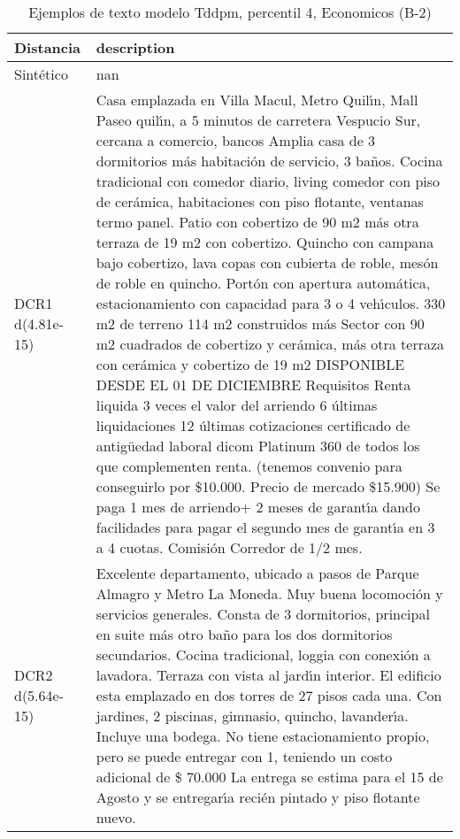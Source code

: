 \begin{table}[H]
\centering
\fontsize{10}{14}\selectfont
\caption{Ejemplos de texto modelo Tddpm, percentil 4, Economicos (B-2)}
\label{table-example-economicos-b-2-tddpm_mlp-4p-text}
\begin{tabular}{|l|m{35em}|}
\hline
\rowcolor[gray]{0.8}
Distancia & description \\
\hline Sintético & nan \\
\hline DCR1 d(4.81e-15) & Casa emplazada en Villa Macul, Metro Quil{\'\i}n, Mall Paseo quil{\'\i}n, a 5 minutos de carretera Vespucio Sur, cercana a comercio, bancos Amplia casa de 3 dormitorios m\'as habitaci\'on de servicio, 3 ba\~nos. Cocina tradicional con comedor diario, living comedor con piso de cer\'amica, habitaciones con piso flotante, ventanas termo panel. Patio con cobertizo de 90 m2 m\'as otra terraza de 19 m2 con cobertizo. Quincho con campana bajo cobertizo, lava copas con cubierta de roble, mes\'on de roble en quincho. Port\'on con apertura autom\'atica, estacionamiento con capacidad para 3 o 4 veh{\'\i}culos.   330 m2 de terreno 114 m2 construidos m\'as Sector con 90 m2 cuadrados de cobertizo y cer\'amica, m\'as otra terraza con cer\'amica y cobertizo de 19 m2  DISPONIBLE DESDE EL 01 DE DICIEMBRE  Requisitos Renta liquida 3 veces el valor del arriendo 6 \'ultimas liquidaciones 12 \'ultimas cotizaciones certificado de antig\"uedad laboral  dicom Platinum 360 de todos los que complementen renta. (tenemos convenio para conseguirlo por \$10.000. Precio de mercado \$15.900)  Se paga 1 mes de arriendo+ 2 meses de garant{\'\i}a dando facilidades para pagar el segundo mes de garant{\'\i}a en 3 a 4 cuotas. Comisi\'on Corredor de 1/2 mes. \\
\hline DCR2 d(5.64e-15) & Excelente departamento, ubicado a pasos de Parque Almagro y Metro La Moneda. Muy buena locomoci\'on y servicios generales. Consta de 3 dormitorios, principal en suite m\'as otro ba\~no para los dos dormitorios secundarios. Cocina tradicional, loggia con conexi\'on a lavadora.  Terraza con vista al jard{\'\i}n interior. El edificio esta emplazado en dos torres de 27 pisos cada una. Con jardines, 2 piscinas, gimnasio, quincho, lavander{\'\i}a. Incluye una bodega. No tiene estacionamiento propio, pero se puede entregar con 1, teniendo un costo adicional de \$ 70.000 La entrega se estima para el 15 de Agosto y se entregar{\'\i}a reci\'en pintado y piso flotante nuevo. \\
\hline
\end{tabular}
\end{table}
